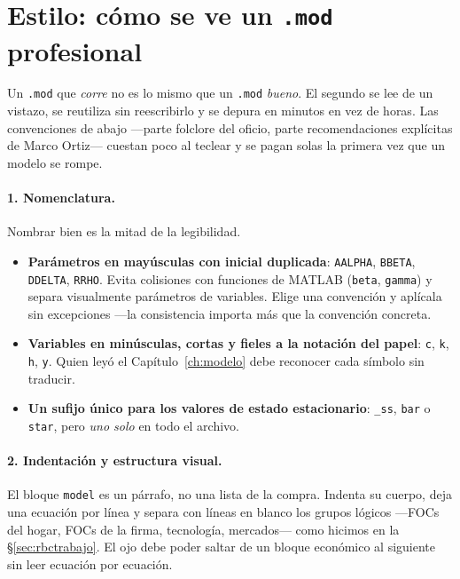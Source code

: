 \documentclass[11pt,a4paper]{report}
\newcommand{\code}[1]{\texttt{#1}}
\begin{document}
\section{Estilo: cómo se ve un \code{.mod} profesional}
\label{sec:estilo}

Un \code{.mod} que \emph{corre} no es lo mismo que un \code{.mod} \emph{bueno}. El
segundo se lee de un vistazo, se reutiliza sin reescribirlo y se depura en minutos
en vez de horas. Las convenciones de abajo ---parte folclore del oficio, parte
recomendaciones explícitas de Marco Ortiz--- cuestan poco al teclear y se pagan
solas la primera vez que un modelo se rompe.

\paragraph{1. Nomenclatura.} Nombrar bien es la mitad de la legibilidad.
\begin{itemize}[leftmargin=1.4em, topsep=2pt, itemsep=3pt]
\item \textbf{Parámetros en mayúsculas con inicial duplicada}: \code{AALPHA},
  \code{BBETA}, \code{DDELTA}, \code{RRHO}. Evita colisiones con funciones de MATLAB
  (\code{beta}, \code{gamma}) y separa visualmente parámetros de variables. Elige
  una convención y aplícala sin excepciones ---la consistencia importa más que la
  convención concreta.
\item \textbf{Variables en minúsculas, cortas y fieles a la notación del papel}:
  \code{c}, \code{k}, \code{h}, \code{y}. Quien leyó el Capítulo~\ref{ch:modelo}
  debe reconocer cada símbolo sin traducir.
\item \textbf{Un sufijo único para los valores de estado estacionario}: \code{\_ss},
  \code{bar} o \code{star}, pero \emph{uno solo} en todo el archivo.
\end{itemize}

\paragraph{2. Indentación y estructura visual.} El bloque \code{model} es un párrafo,
no una lista de la compra. Indenta su cuerpo, deja una ecuación por línea y separa
con líneas en blanco los grupos lógicos ---FOCs del hogar, FOCs de la firma,
tecnología, mercados--- como hicimos en la \S\ref{sec:rbctrabajo}. El ojo debe poder
saltar de un bloque económico al siguiente sin leer ecuación por ecuación.
\end{document}

